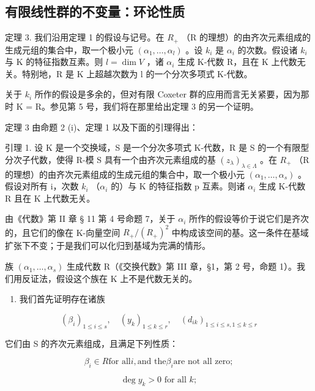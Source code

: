 \subsection{有限线性群的不变量：环论性质}

定理 3. 我们沿用定理 1 的假设与记号。在 \(R_{+}\) （R 的理想）的由齐次元素组成的生成元组的集合中，取一个极小元 \((\alpha_{1},\ldots,\alpha_{l})\) 。设 \(k_{i}\) 是 \(\alpha_{i}\) 的次数。假设诸 \(k_{i}\) 与 K 的特征指数互素。则 \(l=\dim V\) ，诸 \(\alpha_{i}\) 生成 K-代数 R，且在 K 上代数无关。特别地，R 是 K 上超越次数为 l 的一个分次多项式 K-代数。

关于 \(k_{i}\) 所作的假设是多余的，但对有限 Coxeter 群的应用而言无关紧要，因为那时 K = R。参见第 5 号，我们将在那里给出定理 3 的另一个证明。

定理 3 由命题 2 (i)、定理 1 以及下面的引理得出：

引理 1. 设 K 是一个交换域，S 是一个分次多项式 K-代数，R 是 S 的一个有限型分次子代数，使得 R-模 S 具有一个由齐次元素组成的基 \((z_{\lambda})_{\lambda \in \Lambda}\) 。在 \(R_{+}\) （R 的理想）的由齐次元素组成的生成元组的集合中，取一个极小元 \((\alpha_{1}, \ldots, \alpha_{s})\) 。假设对所有 i，次数 \(k_{i}\) （\(\alpha_{i}\) 的）与 K 的特征指数 p 互素。则诸 \(\alpha_{i}\) 生成 K-代数 R 且在 K 上代数无关。

由《代数》第 II 章 § 11 第 4 号命题 7，关于 \(\alpha_{i}\) 所作的假设等价于说它们是齐次的，且它们的像在 K-向量空间 \(R_{+}/(R_{+})^{2}\) 中构成该空间的基。这一条件在基域扩张下不变；于是我们可以化归到基域为完满的情形。

族 \((\alpha_{1},\ldots,\alpha_{s})\) 生成代数 R（《交换代数》第 III 章，§1，第 2 号，命题 1）。我们用反证法，假设这个族在 K 上不是代数无关的。

\begin{enumerate}
\def\labelenumi{\arabic{enumi})}
\tightlist
\item
  我们首先证明存在诸族
\end{enumerate}

\[
\left(\beta_ {i}\right) _ {1 \leqslant i \leqslant s}, \quad \left(y _ {k}\right) _ {1 \leqslant k \leqslant r}, \quad \left(d _ {i k}\right) _ {1 \leqslant i \leqslant s, 1 \leqslant k \leqslant r}
\]

它们由 S 的齐次元素组成，且满足下列性质：

\[
\beta_ {i} \in R \text {for all} i, \text {and the} \beta_ {i} \text {are not all zero};\tag{7}
\]

\[
\deg y _ {k} > 0 \text {   for   all   } k;\tag{8}
\]

